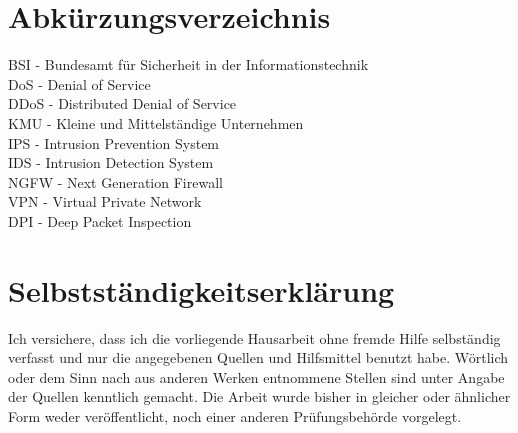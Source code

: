 \documentclass[12pt]{scrreprt}
\begin{document}
	
		
		
	\thispagestyle{empty}
	
	\tableofcontents
	\newpage
	
	\setcounter{page}{1}
	
	

	
	
	
    
    
    
    
	\newpage
	
	
	\chapter{Abkürzungsverzeichnis}
	BSI - Bundesamt für Sicherheit in der Informationstechnik \\
	DoS - Denial of Service \\
	DDoS - Distributed Denial of Service\\
	KMU - Kleine und Mittelständige Unternehmen\\
	IPS - Intrusion Prevention System\\
	IDS - Intrusion Detection System\\
	NGFW - Next Generation Firewall\\
	VPN - Virtual Private Network\\
	DPI - Deep Packet Inspection
	
	\newpage
	\chapter{Selbstständigkeitserklärung}
	Ich versichere, dass ich die vorliegende Hausarbeit ohne
	fremde Hilfe selbständig verfasst und nur die angegebenen Quellen und Hilfsmittel
	benutzt habe. Wörtlich oder dem Sinn nach aus anderen Werken entnommene Stellen
	sind unter Angabe der Quellen kenntlich gemacht. Die Arbeit wurde bisher in gleicher
	oder ähnlicher Form weder veröffentlicht, noch einer anderen Prüfungsbehörde
	vorgelegt. 
	\vspace{16cm}
	
\end{document}
